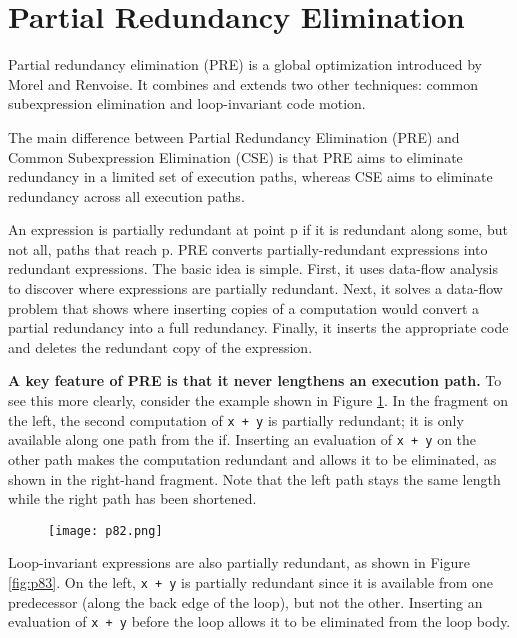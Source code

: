 \newpage

\section{Partial Redundancy Elimination}
Partial redundancy elimination (PRE) is a global optimization introduced by Morel and Renvoise\cite{morel1979global}. It
combines and extends two other techniques: common subexpression elimination and loop-invariant code motion.



The main difference between Partial Redundancy Elimination (PRE) and Common Subexpression Elimination (CSE)
is that PRE aims to eliminate redundancy in a limited set of execution paths,
whereas CSE aims to eliminate redundancy across all execution paths.


An expression is partially redundant at point p if it
is redundant along some, but not all, paths that reach
p. PRE converts partially-redundant expressions into
redundant expressions. The basic idea is simple. First,
it uses data-flow analysis to discover where expressions
are partially redundant. Next, it solves a data-flow
problem that shows where inserting copies of a computation would convert a partial redundancy into a full
redundancy. Finally, it inserts the appropriate code and
deletes the redundant copy of the expression.

\textbf{A key feature of PRE is that it never lengthens an
	execution path.} To see this more clearly, consider the
example shown in Figure \ref{fig:p82}. In the fragment on the left, the second
computation of \texttt{x + y} is partially redundant; it is only
available along one path from the if. Inserting an evaluation of
\texttt{x + y} on the other path makes the computation
redundant and allows it to be eliminated, as shown in
the right-hand fragment. Note that the left path stays
the same length while the right path has been shortened.


\begin{figure}[H]
	\centering
	\texttt{[image: p82.png]}
	\caption{}
	\label{fig:p82}
\end{figure}


Loop-invariant expressions are also partially redundant,
as shown in Figure \ref{fig:p83}. On the left, \texttt{x + y} is
partially redundant since it is available from one predecessor
(along the back edge of the loop), but not the
other. Inserting an evaluation of \texttt{x + y} before the loop
allows it to be eliminated from the loop body.


